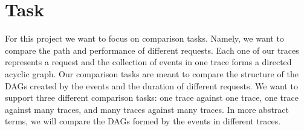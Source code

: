 \section{Task}

For this project we want to focus on comparison tasks. Namely, we want to compare the path and performance of different
requests. Each one of our traces represents a request and the collection of events in one trace forms a directed acyclic graph. Our
comparison tasks are meant to compare the structure of the DAGs created by the events and the duration of different requests. 
We want to support three different comparison tasks: one trace against one trace, one trace against many traces, and many traces
against many traces. In more abstract terms, we will compare the DAGs formed by the events in different traces.  